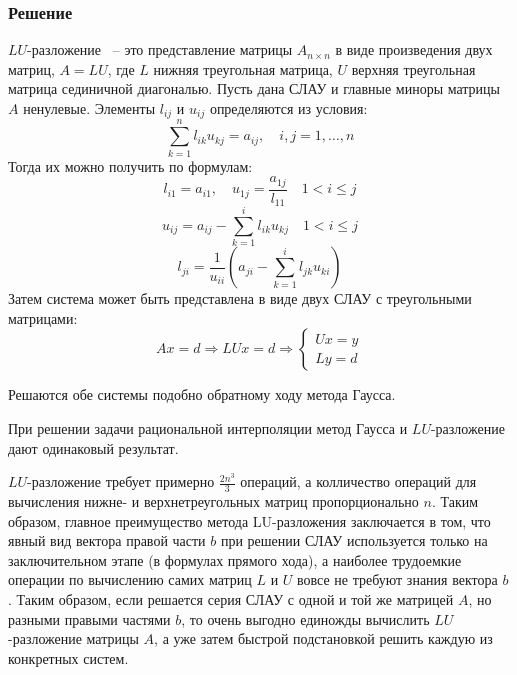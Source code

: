\documentclass[a4paper, fontsize=14pt]{article}
\begin{document}
\subsubsection*{Решение}
$LU$-разложение ~-- это представление матрицы $A_{n\times n}$ в виде произведения двух матриц, $A = LU$, где $L$ нижняя треугольная матрица, $U$ верхняя треугольная матрица сединичной диагональю.
Пусть дана СЛАУ и главные миноры матрицы $A$ ненулевые. Элементы $l_{ij}$ и $u_{ij}$ определяются из условия:
\begin{equation*}
    \sum_{k=1}^{n} l_{ik} u_{kj} = a_{ij}, \quad i,j = 1, \dots, n
\end{equation*}
Тогда их можно получить по формулам:
\begin{equation*}
    l_{i1} = a_{i1}, \quad u_{1j} = \frac{a_{1j}}{l_{11}} \quad 1 < i \leq j
\end{equation*}
\begin{equation*}
    u_{ij} = a_{ij} - \sum_{k=1}^i l_{ik} u_{kj} \quad 1 < i \leq j
\end{equation*}
\begin{equation*}
    l_{ji} = \frac{1}{u_{ii}} \left(a_{ji} - \sum_{k=1}^i l_{jk} u_{ki}\right)
\end{equation*}
Затем система может быть представлена в виде двух СЛАУ с треугольными матрицами:
\begin{equation*}
    Ax = d \Rightarrow LUx = d \Rightarrow 
    \begin{cases}
        Ux = y \\
        Ly = d
    \end{cases}
\end{equation*}

Решаются обе системы подобно обратному ходу метода Гаусса. 

При решении задачи рациональной интерполяции метод Гаусса и $LU$-разложение дают одинаковый результат.

$LU$-разложение требует примерно $\frac{2 n^3}{3}$ операций, а колличество операций для вычисления нижне- и верхнетреугольных матриц пропорционально $n$.
Таким образом, главное преимущество метода LU-разложения заключается в том,
что явный вид вектора правой части $b$ при решении СЛАУ
используется только на заключительном этапе (в формулах
прямого хода), а наиболее трудоемкие операции по вычислению
самих матриц $L$ и $U$ вовсе не требуют знания вектора $b$. Таким
образом, если решается серия СЛАУ с одной и той же матрицей
$A$, но разными правыми частями $b$, то очень
выгодно единожды вычислить $LU$-разложение матрицы $A$, а уже
затем быстрой подстановкой решить каждую из конкретных
систем.
\end{document}
